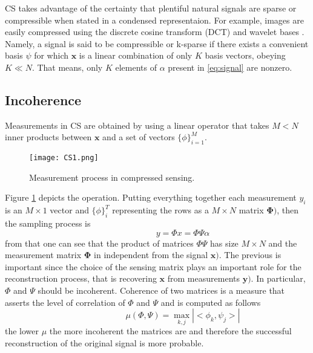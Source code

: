 CS takes advantage of the certainty that plentiful natural signals are sparse or compressible when stated in a condensed representaion. For example, images are easily compressed using the discrete cosine transform (DCT) and wavelet bases \cite{mallat1999wavelet}. Namely, a signal is said to be compressible or k-sparse if there exists a convenient basis $\psi$ for which $\mathbf{x}$ is a linear combination of only $K$ basis vectors, obeying $K \ll N$. That means, only $K$ elements of $\alpha$ present in \ref{eq:signal} are nonzero. 

\FloatBarrier

\subsection{Incoherence}
Measurements in CS are obtained by using a linear operator that takes $M < N$ inner products between $\mathbf{x}$ and a set of vectors $\{\phi\}_{i=1}^{M}$. 
\begin{figure}[!tb] 
\centering 
\texttt{[image: CS1.png]} 
\caption[Compressed sensing measurement process]{Measurement process in compressed sensing.}
\label{fig:csmea} 
\end{figure}
Figure \ref{fig:csmea} depicts the operation. Putting everything together each measurement $y_i$ is an $ M \times 1$ vector and $\{\phi\}_{i}^{T}$ representing the rows as a $ M \times N$ matrix $\mathbf{\Phi)}$, then the sampling process is
\begin{equation} \label{eq:signal2}
\hspace{3em} \hspace{3em} \hspace{3em} y = \Phi x = \Phi\Psi\alpha \hspace{3em}
\end{equation}    
from that one can see that the product of matrices $\Phi\Psi$ has size $ M \times N$ and the measurement matrix $\mathbf{\Phi}$ in independent from the signal $\mathbf{x)}$. The previous is important since the choice of the sensing matrix plays an important role for the reconstruction process, that is recovering $\mathbf{x}$ from measurements $\mathbf{y)}$. In particular, $\Phi$ and $\Psi$ should be incoherent. Coherence of two matrices is a measure that asserts the level of correlation of $\Phi$ and $\Psi$ and is computed as follows
\begin{equation} \label{eq:signal3}
\hspace{3em} \hspace{3em} \hspace{3em} \mu(\Phi,\Psi) = \max_{k,j}|<\phi_k,\psi_j>|  \hspace{3em}
\end{equation}   
the lower $\mu$ the more incoherent the matrices are and therefore the successful reconstruction of the original signal is more probable.

